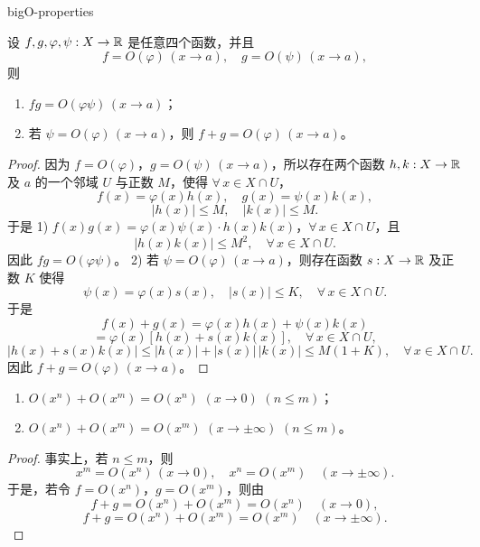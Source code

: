 \begin{mythm}{}{bigO-properties}

设 $f,g,\varphi,\psi:X\to\mathbb{R}$ 是任意四个函数，并且
\[f=O(\varphi)\,(x\to a),\quad g=O(\psi)\,(x\to a),\]
则
\begin{enumerate}[label=\arabic{enumi})]
\item $fg=O(\varphi\psi)\,(x\to a)$；
\item 若 $\psi=O(\varphi)\,(x\to a)$，则 $f+g=O(\varphi)\,(x\to a)$。
\end{enumerate}

\end{mythm}

\begin{proof}

因为 $f=O(\varphi)$，$g=O(\psi)\,(x\to a)$，所以存在两个函数 $h,k:X\to\mathbb{R}$ 及 $a$ 的一个邻域 $U$ 与正数 $M$，使得 $\forall\,x\in X\cap U$，
\[f(x)=\varphi(x)h(x),\quad g(x)=\psi(x)k(x),\]
\[|h(x)|\leqslant M,\quad |k(x)|\leqslant M.\]
于是 1) $f(x)g(x)=\varphi(x)\psi(x)\cdot h(x)k(x)$，$\forall\,x\in X\cap U$，且
\[|h(x)k(x)|\leqslant M^2,\quad \forall\,x\in X\cap U.\]
因此 $fg=O(\varphi\psi)$。
2) 若 $\psi=O(\varphi)\,(x\to a)$，则存在函数 $s:X\to\mathbb{R}$ 及正数 $K$ 使得
\[\psi(x)=\varphi(x)s(x),\quad |s(x)|\leqslant K,\quad \forall\,x\in X\cap U.\]
于是
\[f(x)+g(x)=\varphi(x)h(x)+\psi(x)k(x)\]
\[=\varphi(x)[h(x)+s(x)k(x)],\quad \forall\,x\in X\cap U,\]
\[|h(x)+s(x)k(x)|\leqslant|h(x)|+|s(x)|\,|k(x)|\leqslant M(1+K),\quad \forall\,x\in X\cap U.\]
因此 $f+g=O(\varphi)\,(x\to a)$。

\end{proof}

\begin{mycor*}{}

\begin{enumerate}[label=\arabic{enumi})]
\item $O(x^n)+O(x^m)=O(x^n)$ $(x\to0)$ $(n\leqslant m)$；
\item $O(x^n)+O(x^m)=O(x^m)$ $(x\to\pm\infty)$ $(n\leqslant m)$。
\end{enumerate}

\end{mycor*}

\begin{proof}

事实上，若 $n\leqslant m$，则
\[x^m=O(x^n)\,(x\to0),\quad x^n=O(x^m)\quad(x\to\pm\infty).\]
于是，若令 $f=O(x^n)$，$g=O(x^m)$，则由
\[f+g=O(x^n)+O(x^m)=O(x^n)\quad(x\to0),\]
\[f+g=O(x^n)+O(x^m)=O(x^m)\quad(x\to\pm\infty).\]

\end{proof}

